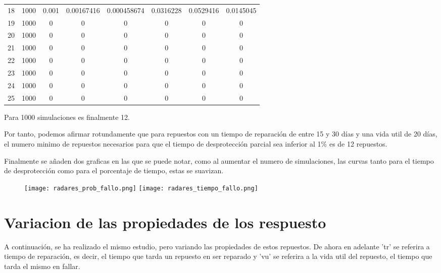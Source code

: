 \begin{table}[h]
{\begin{tabular}{|c|c|c|c|c|c|c|c|}
18 & 1000 & 0.001 & 0.00167416 & 0.000458674 & 0.0316228 & 0.0529416 & 0.0145045 \\
19 & 1000 & 0 & 0 & 0 & 0 & 0 & 0 \\
20 & 1000 & 0 & 0 & 0 & 0 & 0 & 0 \\
21 & 1000 & 0 & 0 & 0 & 0 & 0 & 0 \\
22 & 1000 & 0 & 0 & 0 & 0 & 0 & 0 \\
23 & 1000 & 0 & 0 & 0 & 0 & 0 & 0 \\
24 & 1000 & 0 & 0 & 0 & 0 & 0 & 0 \\
25 & 1000 & 0 & 0 & 0 & 0 & 0 & 0 \\ \hline
\end{tabular}%
}
\end{table}

Para 1000 simulaciones es finalmente 12.

Por tanto, podemos afirmar rotundamente que para repuestos con un tiempo de reparación de entre 15 y 30 días y una vida util de 20 días, el numero minimo de repuestos necesarios para que el tiempo de desprotección parcial sea inferior al 1\% es de 12 repuestos.

Finalmente se añaden dos graficas en las que se puede notar, como al aumentar el numero de simulaciones, las curvas tanto para el tiempo de desprotección como para el porcentaje de tiempo, estas se suavizan.

\newpage


\begin{figure}[h]
\texttt{[image: radares\_prob\_fallo.png]}
\texttt{[image: radares\_tiempo\_fallo.png]}
\centering
\end{figure}

\newpage

\section{Variacion de las  propiedades de los respuesto}
A continuación, se ha realizado el mismo estudio, pero variando las propiedades de estos repuestos. De ahora en adelante 'tr' se referira a tiempo de reparación, es decir, el tiempo que tarda un repuesto en ser reparado y 'vu' se referira a la vida util del repuesto, el tiempo que tarda el mismo en fallar.

